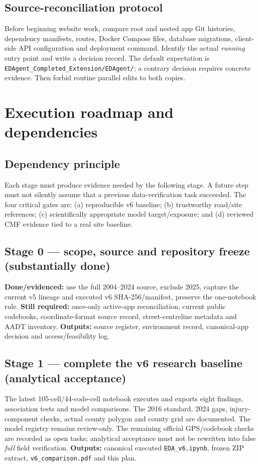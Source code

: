 \documentclass[11pt,a4paper,openany]{report}
\newcommand{\pathcode}[1]{\nolinkurl{#1}}
\begin{document}
\section{Source-reconciliation protocol}
Before beginning website work, compare root and nested app Git histories, dependency manifests, routes, Docker Compose files, database migrations, client-side API configuration and deployment command. Identify the actual \emph{running} entry point and write a decision record. The default expectation is \pathcode{EDAgent_Completed_Extension/EDAgent/}; a contrary decision requires concrete evidence. Then forbid routine parallel edits to both copies.

\chapter{Execution roadmap and dependencies}
\section{Dependency principle}
Each stage must produce evidence needed by the following stage. A future step must not silently assume that a previous data-verification task succeeded. The four critical gates are: (a) reproducible v6 baseline; (b) trustworthy road/site references; (c) scientifically appropriate model target/exposure; and (d) reviewed CMF evidence tied to a real site baseline.

\section{Stage 0 --- scope, source and repository freeze (substantially done)}
\textbf{Done/evidenced:} use the full 2004--2024 source, exclude 2025, capture the current v5 lineage and executed v6 SHA-256/manifest, preserve the one-notebook rule. \textbf{Still required:} once-only active-app reconciliation, current public codebooks, coordinate-format source record, street-centreline metadata and AADT inventory. \textbf{Outputs:} source register, environment record, canonical-app decision and access/feasibility log.

\section{Stage 1 --- complete the v6 research baseline (analytical acceptance)}
The latest 105-cell/44-code-cell notebook executes and exports eight findings, association tests and model comparisons. The 2016 standard, 2024 gaps, injury-component checks, actual county polygon and county grid are documented. The model registry remains review-only. The remaining official GPS/codebook checks are recorded as open tasks; analytical acceptance must not be rewritten into false \emph{full} field verification. \textbf{Outputs:} canonical executed \pathcode{EDA_v6.ipynb}, frozen ZIP extract, \pathcode{v6_comparison.pdf} and this plan.
\end{document}
